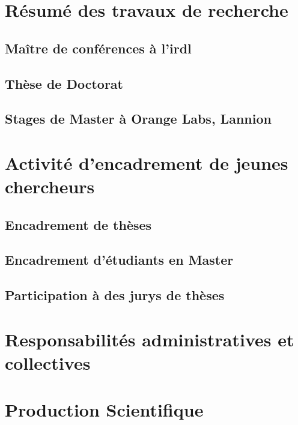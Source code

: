 \section{Résumé des travaux de recherche}

\subsection{Maître de conférences à l'\gls{irdl}}
 

\subsection{Thèse de Doctorat}
\subsection{Stages de Master à Orange Labs, Lannion}

\section{Activité d'encadrement de jeunes chercheurs}

\subsection{Encadrement de thèses}

\subsection{Encadrement d'étudiants en Master}


\subsection{Participation à des jurys de thèses}

\section{Responsabilités administratives et collectives}

\section{Production Scientifique}
